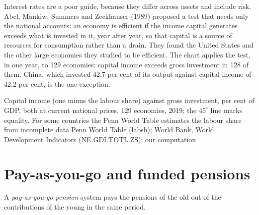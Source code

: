 \begin{record}
Interest rates are a poor guide, because they differ across assets and include risk. Abel, Mankiw, Summers and Zeckhauser
(1989) proposed a test that needs only the national accounts: an economy is efficient if the income capital generates
exceeds what is invested in it, year after year, so that capital is a source of resources for consumption rather than a
drain. They found the United States and the other large economies they studied to be efficient. The chart applies the
test, in one year, to 129 economies: capital income exceeds gross investment in 128 of them. China, which invested 42.7 per
cent of its output against capital income of 42.2 per cent, is the one exception.
\end{record}

\begin{omchart}{Capital income (one minus the labour share) against gross investment, per cent of GDP, both at current
  national prices, 129 economies, 2019; the $45^\circ$ line marks equality. For some countries the Penn World Table
  estimates the labour share from incomplete data.}{Penn World Table (labsh); World Bank, World Development Indicators
  (NE.GDI.TOTL.ZS); our computation}
\end{omchart}

\section{Pay-as-you-go and funded pensions}\label{sec:b2:overlapping-generations:pensions}

\begin{definition}\label{def:b2:overlapping-generations:payg}
A \emph{pay-as-you-go pension} system pays the pensions of the old out of the contributions
of the young in the same period.
\end{definition}

